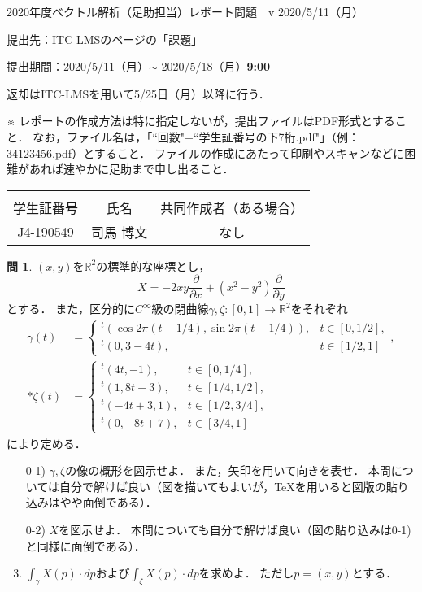 \documentclass[dvipdfmx,nosetpagesize, uplatex]{jsarticle}
\newcommand\GAKUSEISHOBANGO{J4-190549}%
\newcommand\NAMAE{司馬 博文}%
\newcommand\KYODOSAKUSEISHA{なし}%
\newcommand\R{\mathbb{R}}
\theoremstyle{definition}
\newtheorem*{question*}{問}
\theoremstyle{StatementsWithStar}
\theoremstyle{StatementsWithStar2}
\theoremstyle{StatementsWithStar3}
\theoremstyle{StatementsWithCCirc}
\theoremstyle{definition}
\begin{document}
\thispagestyle{empty}
\setlength{\parindent}{1zw}
\setlength{\baselineskip}{13pt}
\setcounter{section}{3}
\setcounter{version}{2}
\noindent
2020年度ベクトル解析（足助担当）レポート問題~\thesection~v\theversion%
\hfil2020/5/11（月）\par\noindent
提出先：ITC-LMSのページの「課題」\par\noindent
提出期間：2020/5/11（月）$\sim$ 2020/5/18（月）\textbf{9:00}\par\noindent
返却はITC-LMSを用いて5/25日（月）以降に行う．\par\noindent
※ レポートの作成方法は特に指定しないが，提出ファイルはPDF形式とすること．
なお，ファイル名は，「``回数"+``学生証番号の下7桁.pdf\/"」（例：34123456.pdf）とすること．
ファイルの作成にあたって印刷やスキャンなどに困難があれば速やかに足助まで申し出ること．
\vskip-18pt\noindent
\begin{table}[h]
\begin{tabular}{|c|c|c|} \hline
& & \\[-13pt]
学生証番号& 氏名 & 共同作成者（ある場合）\\[2pt] \hline
\rule{0pt}{16pt}%
\parbox[c]{9.2zw}{\GAKUSEISHOBANGO\hfill} & \parbox[c]{13.0zw}{\NAMAE\hfill} & \parbox[c]{25.6zw}{\KYODOSAKUSEISHA\hfill}\\[6pt] \hline
\end{tabular}
\end{table}
% 
\begin{question*}
$(x,y)$を$\R^2$の標準的な座標とし，
\[
X=-2xy\frac{\partial}{\partial x}+(x^2-y^2)\frac{\partial}{\partial y}
\]
とする．
また，区分的に$C^\infty$級の閉曲線$\gamma,\zeta\colon[0,1]\to\R^2$をそれぞれ
\begin{align*}
\gamma(t)&=\begin{cases}
{}^t(\cos2\pi(t-1/4),\sin2\pi(t-1/4)), & t\in[0,1/2],\\
{}^t(0,3-4t), & t\in[1/2,1]
\end{cases},\\*
\zeta(t)&=\begin{cases}
{}^t(4t,-1), & t\in[0,1/4],\\
{}^t(1,8t-3), & t\in[1/4,1/2],\\
{}^t(-4t+3,1), & t\in[1/2,3/4],\\
{}^t(0,-8t+7), & t\in[3/4,1]
\end{cases}
\end{align*}
により定める．
\begin{enumerate}
\item[0-1)]
$\gamma,\zeta$の像の概形を図示せよ．
また，矢印を用いて向きを表せ．
本問については自分で解けば良い（図を描いてもよいが，\TeX を用いると図版の貼り込みはやや面倒である）．
\item[0-2)]
$X$を図示せよ．
本問についても自分で解けば良い（図の貼り込みは0-1)と同様に面倒である）．
\item
$\int_{\gamma}X(p)\cdot dp$および$\int_{\zeta}X(p)\cdot dp$を求めよ．
ただし$p=(x,y)$とする．
\end{enumerate}
\end{question*}
\end{document}
